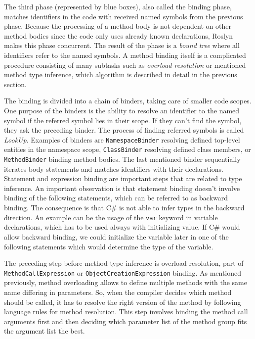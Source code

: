 The third phase (represented by blue boxes), also called the binding phase, matches identifiers in the code with received named symbols from the previous phase. 
Because the processing of a method body is not dependent on other method bodies since the code only uses already known declarations, Roslyn makes this phase concurrent. 
The result of the phase is a \emph{bound tree} where all identifiers refer to the named symbols. 
A method binding itself is a complicated procedure consisting of many subtasks such as \emph{overload resolution} or mentioned method type inference, which algorithm is described in detail in the previous section.
\par
The binding is divided into a chain of binders, taking care of smaller code scopes. 
One purpose of the binders is the ability to resolve an identifier to the named symbol if the referred symbol lies in their scope. 
If they can’t find the symbol, they ask the preceding binder. 
The process of finding referred symbols is called \emph{LookUp}. 
Examples of binders are \texttt{NamespaceBinder} resolving defined top-level entities in the namespace scope, \texttt{ClassBinder} resolving defined class members, or \texttt{MethodBinder} binding method bodies. 
The last mentioned binder sequentially iterates body statements and matches identifiers with their declarations. 
Statement and expression binding are important steps that are related to type inference.
An important observation is that statement binding doesn’t involve binding of the following statements, which can be referred to as backward binding. 
The consequence is that C\# is not able to infer types in the backward direction. 
An example can be the usage of the \texttt{var} keyword in variable declarations, which has to be used always with initializing value. 
If C\# would allow backward binding, we could initialize the variable later in one of the following statements which would determine the type of the variable.
\par
The preceding step before method type inference is overload resolution, part of \texttt{MethodCallExpression} or \texttt{ObjectCreationExpression} binding. 
As mentioned previously, method overloading allows to define multiple methods with the same name differing in parameters. 
So, when the compiler decides which method should be called, it has to resolve the right version of the method by following language rules for method resolution. 
This step involves binding the method call arguments first and then deciding which parameter list of the method group fits the argument list the best. 
